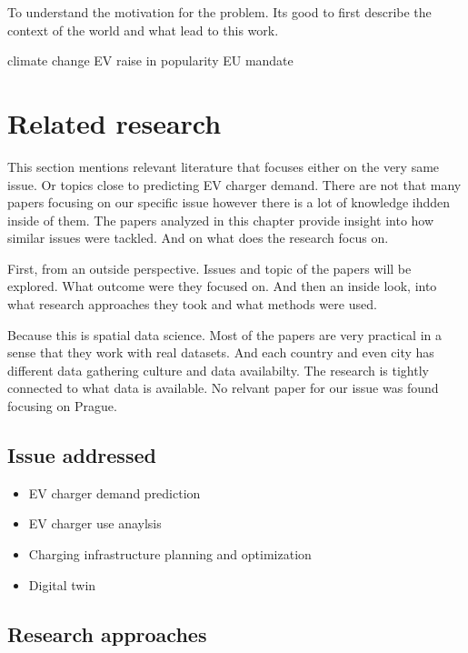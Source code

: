 To understand the motivation for the problem. Its good to first describe the context of the world and what lead to this work.

\begin{outline}
    \1 climate change
    \1 EV raise in popularity
    \1 EU mandate
\end{outline}

\setchapterpreamble[u]{\margintoc}
\chapter{Related research}

This section mentions relevant literature that focuses either on the very same issue. Or topics close to predicting EV charger demand. There are not that many papers focusing on our specific issue however there is a lot of knowledge ihdden inside of them. The papers analyzed in this chapter provide insight into how similar issues were tackled. And on what does the research focus on.


First, from an outside perspective. Issues and topic of the papers will be explored. What outcome were they focused on. And then an inside look, into what research approaches they took and what methods were used.

Because this is spatial data science. Most of the papers are very practical in a sense that they work with real datasets. And each country and even city has different data gathering culture and data availabilty. The research is tightly connected to what data is available. No relvant paper for our issue was found focusing on Prague.

\section{Issue addressed}

\begin{itemize}
    \item EV charger demand prediction
    \item EV charger use anaylsis
    \item Charging infrastructure planning and optimization
    \item Digital twin
\end{itemize}

\section{Research approaches}

